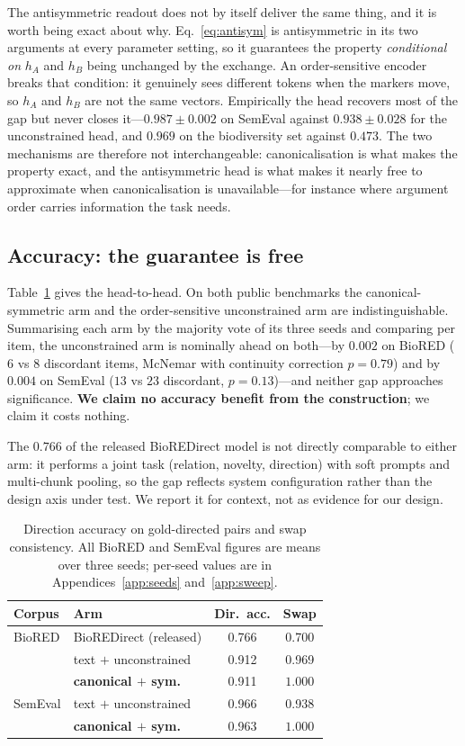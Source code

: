 \documentclass[11pt]{article}
\begin{document}
The antisymmetric readout does not by itself deliver the same thing, and it is worth being
exact about why. Eq.~\ref{eq:antisym} is antisymmetric in its two arguments at every parameter
setting, so it guarantees the property \emph{conditional on} $h_A$ and $h_B$ being unchanged by
the exchange. An order-sensitive encoder breaks that condition: it genuinely sees different
tokens when the markers move, so $h_A$ and $h_B$ are not the same vectors. Empirically the head
recovers most of the gap but never closes it---$0.987 \pm 0.002$ on SemEval against $0.938 \pm
0.028$ for the unconstrained head, and $0.969$ on the biodiversity set against $0.473$. The two
mechanisms are therefore not interchangeable: canonicalisation is what makes the property
exact, and the antisymmetric head is what makes it nearly free to approximate when
canonicalisation is unavailable---for instance where argument order carries information the
task needs.

\subsection{Accuracy: the guarantee is free}
\label{sec:res-accuracy}
Table~\ref{tab:main} gives the head-to-head. On both public benchmarks the canonical-symmetric
arm and the order-sensitive unconstrained arm are indistinguishable. Summarising each arm by the
majority vote of its three seeds and comparing per item, the unconstrained arm is nominally
ahead on both---by $0.002$ on BioRED ($6$ vs $8$ discordant items, McNemar with continuity
correction $p=0.79$) and by $0.004$ on SemEval ($13$ vs $23$ discordant, $p=0.13$)---and neither
gap approaches significance. \textbf{We claim no accuracy benefit from the construction}; we
claim it costs nothing.

The $0.766$ of the released BioREDirect model is not directly comparable to either arm: it
performs a joint task (relation, novelty, direction) with soft prompts and multi-chunk pooling,
so the gap reflects system configuration rather than the design axis under test. We report it
for context, not as evidence for our design.

\begin{table}[t]
\centering\small
\begin{tabular}{llcc}
\toprule
Corpus & Arm & Dir.\ acc. & Swap \\
\midrule
BioRED & BioREDirect (released) & 0.766 & 0.700 \\
       & text $+$ unconstrained & 0.912 & 0.969 \\
       & \textbf{canonical $+$ sym.} & 0.911 & $\mathbf{1.000}$ \\
\midrule
SemEval & text $+$ unconstrained & 0.966 & 0.938 \\
        & \textbf{canonical $+$ sym.} & 0.963 & $\mathbf{1.000}$ \\
\bottomrule
\end{tabular}
\caption{Direction accuracy on gold-directed pairs and swap consistency. All BioRED and
SemEval figures are means over three seeds; per-seed values are in
Appendices~\ref{app:seeds} and~\ref{app:sweep}.}
\label{tab:main}
\end{table}
\end{document}
